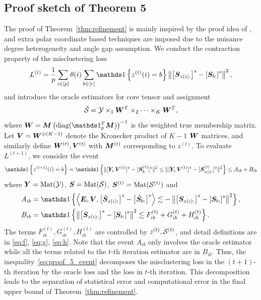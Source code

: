 \documentclass[lettersize,onecolumn,journal]{IEEEtran}
\theoremstyle{definition}
\theoremstyle{definition}
\newcommand{\of}[1]{\left(#1\right)}
\newcommand{\off}[1]{\left[#1\right]}
\newcommand{\offf}[1]{\left\{#1\right\}}
\newcommand{\ang}[1]{\left\langle#1\right\rangle}
\begin{document}
{\subsection{Proof sketch of Theorem 5}
The proof of Theorem~\ref{thm:refinement} is mainly inspired by the proof idea of  \citet[Theorem 2]{han2020exact}, and extra polar coordinate based techniques are imposed due to the nuisance degree heterogeneity and angle gap assumption. We conduct the contraction property of the misclustering loss
\begin{equation}
     L^{(t)} = \frac{1}{p}  \sum_{i \in [p]} \theta(i) \sum_{b \in [r]}  \ind \offf{ z^{(t)}(i) = b } \onorm{ \off{ \mS_{ z(i):}  }^s - \off{ \mS_{b:}  }^s  }^2,
\end{equation}
and introduce the oracle estimators for core tensor and assignment
\begin{equation}
    \tilde {\mathcal{S}} = \mathcal{Y} \times_1 \bm{W}^T \times_2 \cdots \times_K \bm{W}^T, 
\end{equation}
where $\mW = \mM \of{ \text{diag}(\ind_{p}^T \mM) }^{-1}$ is the weighted true membership matrix. Let $ \bm{V} = \bm{W}^{\otimes (K-1)}$ denote the Kronecker product of $K-1$ $\bm{W}$ matrices, and similarly define $\bm{W}^{(t)}, \bm{V}^{(t)}$ with $\bm M^{(t)}$ corresponding to $z^{(t)}$. To evaluate $L^{(t+1)}$, we consider the event 
\begin{equation}\label{eq:proof_5_event}
    \ind \offf{ z^{(t+1)}(i) = b } = \ind \offf{       \onormSize{}{ [ \mY_{i:} \mV^{(t)}  ]^s - [\mS_{b:}^{(t)}]^s }^2 \leq \onormSize{}{ [ \mY_{i:} \mV^{(t)}  ]^s - [\mS_{z(i):}^{(t)}]^s }^2} \leq A_{ib} + B_{ib}
\end{equation}
where $\bm Y = \text{Mat}(\mathcal{Y})$, $ \bm S = \text{Mat}(\mathcal{S})$, $\bm S^{(t)} = \text{Mat}(\mathcal{S}^{(t)})$ and
\begin{align}
        A_{ib} &= \ind \offf{\ang{ \mE_{i:} \mV, \off{  \tilde \mS_{z(i):} }^s - \off{  \tilde \mS_{b:} }^s } \lesssim -  \onorm{ \off{ \mS_{z(i):}  }^s - \off{ \mS_{b:}  }^s  }^2 },\\
        B_{ib} &= \ind \offf{\onorm{ \off{ \mS_{z(i):}  }^s - \off{ \mS_{b:}  }^s  }^2 \lesssim F_{ib}^{(t)} + G_{ib}^{(t)} + H_{ib}^{(t)} }.
\end{align}
The terms $F_{ib}^{(t)}, G_{ib}^{(t)}, H_{ib}^{(t)}$ are controlled by $z^{(t)}, \mathcal{S}^{(t)}$, and detail definitions are in \eqref{eq:f}, \eqref{eq:g}, \eqref{eq:h}. Note that the event $A_{ib}$ only involves the oracle estimator while all the terms related to the $t$-th iteration estimator are in $B_{ib}$. Thus, the inequality~\eqref{eq:proof_5_event} decomposes the misclustering loss in the $(t+1)$-th iteration by the oracle loss and the loss in $t$-th iteration. This decomposition leads to the separation of statistical error and computational error in the final upper bound of Theorem~\ref{thm:refinement}.

}
\end{document}
